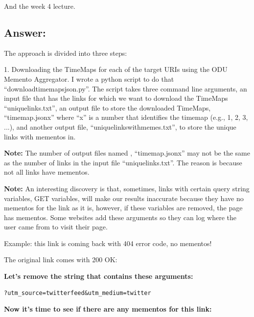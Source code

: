 \documentclass[a4paper, 11pt]{article}
\begin{document}
And the week 4 lecture. 

\subsection*{Answer:}
The approach is divided into three steps:

1. Downloading the TimeMaps for each of the target URIs using the ODU 
Memento Aggregator. I wrote a python script to do that ``downloadtimemapsjson.py''. The script takes three command line arguments, an input file that has the links for which we want to download the TimeMaps ``uniquelinks.txt'', an output file to store the downloaded TimeMaps, ``timemap.jsonx'' where ``x'' is a number that identifies the timemap (e.g., 1, 2, 3, ...), and another output file, ``uniquelinkswithmemes.txt'', to store the unique links with mementos in.

\textbf{Note:} The number of output files named , ``timemap.jsonx'' may not be the same as the number of links in the input file ``uniquelinks.txt''. The reason is because not all links have mementos.

\textbf{Note:} An interesting discovery is that, sometimes, links with certain query string variables, GET variables, will make our results inaccurate because they have no mementos for the link as it is, however, if these variables are removed, the page has mementos. Some websites add these arguments so they can log where the user came from to visit their page.

Example:
this link is coming back with 404 error code, no mementos!


The original link comes with 200 OK:




\noindent
\textbf{Let's remove the string that contains these arguments:}
\begin{lstlisting}
?utm_source=twitterfeed&utm_medium=twitter
\end{lstlisting}
\textbf{Now it's time to see if there are any mementos for this link:}

\noindent
{}

\end{document}
